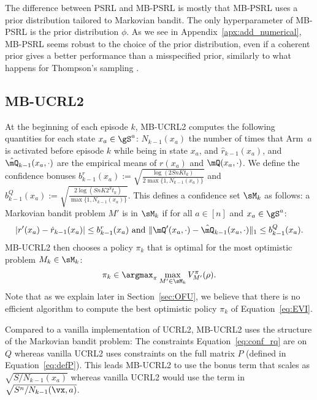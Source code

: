 The difference between PSRL and MB-PSRL is mostly that MB-PSRL uses a prior distribution tailored to Markovian bandit.  The only hyperparameter of MB-PSRL is the prior distribution $\phi$. As we see in Appendix~\ref{apx:add_numerical},
MB-PSRL seems robust to the choice of the prior distribution, even if a
coherent prior gives a better performance than a misspecified prior, similarly
to what happens for Thompson's sampling \cite{russo2018tutorial}. 

\subsection{MB-UCRL2}
At the beginning of each episode $k$, MB-UCRL2 computes the following quantities for each state $x_a\in\gS^a$: $N_{k-1}(x_a)$ the number of times that Arm~$a$ is activated before episode $k$ while being in state $x_a$, and $\hat{r}_{k-1}(x_a)$, and $\hat{\mQ}_{k-1}(x_a,\cdot)$ are the empirical means of $r(x_a)$ and $\mQ(x_a,\cdot)$. We define the confidence bonuses
$b^r_{k-1}(x_a):=\sqrt{\frac{\log(2SnKt_{k})}{2\max\{1,N_{k-1}(x_a)\}}}$
and
$b^Q_{k-1}(x_a):=\sqrt{\frac{2\log(SnK2^St_k)}{\max\{1,N_{k-1}(x_a)\}}}$.
This defines a confidence set $\sM_k$  as follows:  a Markovian bandit problem $M'$
is in $\sM_k$ if for all $a\in[n]$ and $x_a\in\gS^a$: 
\begin{align}
    \label{eq:conf_rq}
    \vert{r'}(x_a) - \hat{r}_{k-1}(x_a)\vert \le b^r_{k-1}(x_a) \text{ and }
    \lVert {\mQ'}(x_a,\cdot) - \hat{\mQ}_{k-1}(x_a,\cdot)\rVert_1 \le b^Q_{k-1}(x_a).            
\end{align}
MB-UCRL2 then chooses a policy $\pi_k$ that is optimal for the most optimistic problem $M_k\in\sM_k$:
\begin{align}
    \pi_k \in \argmax_{\pi} \max_{M'\in\sM_k}V^{\pi}_{M'}(\rho).
    \label{eq:EVI}
\end{align}
Note that as we explain later in Section~\ref{sec:OFU}, we believe that there is no  efficient algorithm to compute the best optimistic policy $\pi_k$ of Equation~\eqref{eq:EVI}.

Compared to a vanilla implementation of UCRL2, MB-UCRL2 uses the structure of the Markovian bandit problem: The constraints Equation~\eqref{eq:conf_rq} are on $Q$ whereas vanilla UCRL2 uses constraints on the full matrix $P$ (defined in Equation~\eqref{eq:defP}). This leads MB-UCRL2 to use the bonus term that scales as $\sqrt{S/N_{k-1}(x_a)}$ whereas vanilla UCRL2 would use the term in $\sqrt{S^n/N_{k-1}(\vx, a)}$.

